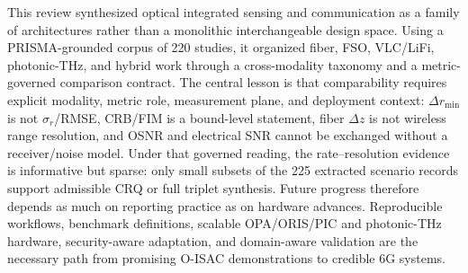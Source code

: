 \documentclass[letterpaper,journal]{IEEEtran}
\begin{document}
This review synthesized optical integrated sensing and communication as a family of architectures rather than a monolithic interchangeable design space. Using a PRISMA-grounded corpus of 220 studies, it organized fiber, FSO, VLC/LiFi, photonic-THz, and hybrid work through a cross-modality taxonomy and a metric-governed comparison contract. The central lesson is that comparability requires explicit modality, metric role, measurement plane, and deployment context: \(\Delta r_{\min}\) is not \(\sigma_r\)/RMSE, CRB/FIM is a bound-level statement, fiber \(\Delta z\) is not wireless range resolution, and OSNR and electrical SNR cannot be exchanged without a receiver/noise model. Under that governed reading, the rate--resolution evidence is informative but sparse: only small subsets of the 225 extracted scenario records support admissible CRQ or full triplet synthesis. Future progress therefore depends as much on reporting practice as on hardware advances. Reproducible workflows, benchmark definitions, scalable OPA/ORIS/PIC and photonic-THz hardware, security-aware adaptation, and domain-aware validation are the necessary path from promising O-ISAC demonstrations to credible 6G systems.









\end{document}
